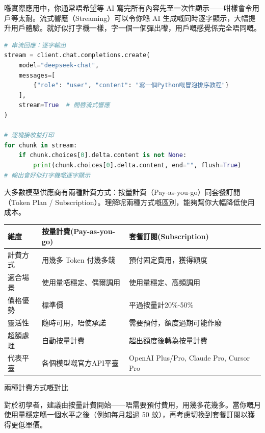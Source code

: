 
喺實際應用中，你通常唔希望等 AI 寫完所有內容先至一次性顯示——咁樣會令用戶等太耐。流式響應（Streaming）可以令你喺 AI 生成嘅同時逐字顯示，大幅提升用戶體驗。就好似打字機一樣，字一個一個彈出嚟，用戶嘅感覺係完全唔同嘅。

\begin{lstlisting}[language=Python]
# 串流回應：逐字輸出
stream = client.chat.completions.create(
    model="deepseek-chat",
    messages=[
        {"role": "user", "content": "寫一個Python嘅冒泡排序教程"}
    ],
    stream=True  # 開啓流式響應
)

# 逐塊接收並打印
for chunk in stream:
    if chunk.choices[0].delta.content is not None:
        print(chunk.choices[0].delta.content, end="", flush=True)
# 輸出會好似打字機噉逐字顯示
\end{lstlisting}


大多數模型供應商有兩種計費方式：按量計費（Pay-as-you-go）同套餐訂閱（Token Plan / Subscription）。理解呢兩種方式嘅區別，能夠幫你大幅降低使用成本。


\begin{center}
\begin{tabularx}{\linewidth}{|X|X|X|}
\hline
\textbf{維度} & \textbf{按量計費(Pay-as-you-go)} & \textbf{套餐訂閱(Subscription)} \tabularnewline
\hline
計費方式 & 用幾多 Token 付幾多錢 & 預付固定費用，獲得額度 \tabularnewline
適合場景 & 使用量唔穩定、偶爾調用 & 使用量穩定、高頻調用 \tabularnewline
價格優勢 & 標準價 & 平過按量計20\%-50\% \tabularnewline
靈活性 & 隨時可用，唔使承諾 & 需要預付，額度過期可能作廢 \tabularnewline
超額處理 & 自動按量計費 & 超出額度後轉為按量計費 \tabularnewline
代表平臺 & 各個模型嘅官方API平臺 & OpenAI Plus/Pro, Claude Pro, Cursor Pro \tabularnewline
\hline
\end{tabularx}
\end{center}

\begin{center}\small\color{gray}兩種計費方式嘅對比\end{center}

對於初學者，建議由按量計費開始——唔需要預付費用，用幾多花幾多。當你嘅月使用量穩定喺一個水平之後（例如每月超過 50 蚊），再考慮切換到套餐訂閱以獲得更低單價。


